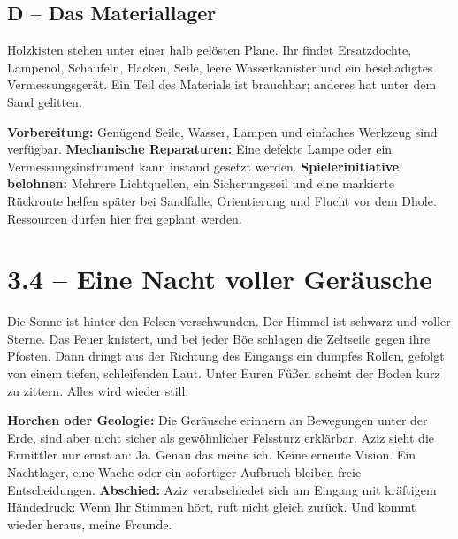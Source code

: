 \subsection{D -- Das Materiallager}
\begin{vorlesetextalle}
Holzkisten stehen unter einer halb gelösten Plane. Ihr findet Ersatzdochte, Lampenöl, Schaufeln, Hacken, Seile, leere Wasserkanister und ein beschädigtes Vermessungsgerät. Ein Teil des Materials ist brauchbar; anderes hat unter dem Sand gelitten.
\end{vorlesetextalle}
\begin{meisterinfo}
\textbf{Vorbereitung:} Genügend Seile, Wasser, Lampen und einfaches Werkzeug sind verfügbar. \textbf{Mechanische Reparaturen:} Eine defekte Lampe oder ein Vermessungsinstrument kann instand gesetzt werden. \textbf{Spielerinitiative belohnen:} Mehrere Lichtquellen, ein Sicherungsseil und eine markierte Rückroute helfen später bei Sandfalle, Orientierung und Flucht vor dem Dhole. Ressourcen dürfen hier frei geplant werden.
\end{meisterinfo}
\section{3.4 -- Eine Nacht voller Geräusche}
\begin{vorlesetextalle}
Die Sonne ist hinter den Felsen verschwunden. Der Himmel ist schwarz und voller Sterne. Das Feuer knistert, und bei jeder Böe schlagen die Zeltseile gegen ihre Pfosten. Dann dringt aus der Richtung des Eingangs ein dumpfes Rollen, gefolgt von einem tiefen, schleifenden Laut. Unter Euren Fü\ss{}en scheint der Boden kurz zu zittern. Alles wird wieder still.
\end{vorlesetextalle}
\begin{meisterinfo}
\textbf{Horchen oder Geologie:} Die Geräusche erinnern an Bewegungen unter der Erde, sind aber nicht sicher als gewöhnlicher Felssturz erklärbar. Aziz sieht die Ermittler nur ernst an: \glqq{}Ja. Genau das meine ich.\grqq{} Keine erneute Vision. Ein Nachtlager, eine Wache oder ein sofortiger Aufbruch bleiben freie Entscheidungen. \textbf{Abschied:} Aziz verabschiedet sich am Eingang mit kräftigem Händedruck: \glqq{}Wenn Ihr Stimmen hört, ruft nicht gleich zurück. Und kommt wieder heraus, meine Freunde.\grqq{}
\end{meisterinfo}
